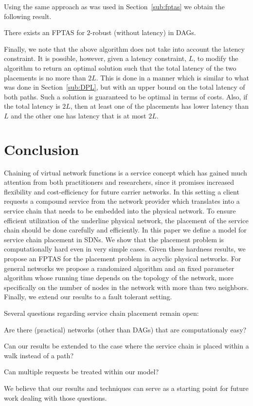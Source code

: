 Using the same approach as was used in Section~\ref{sub:fptas} we
obtain the following result.

\begin{theorem}
There exists an FPTAS for $2$-robust \scp (without latency) in DAGs.
\end{theorem}

Finally, we note that the above algorithm does not take into account
the latency constraint.  It is possible, however, given a latency
constraint, $L$, to modify the algorithm to return an optimal solution
such that the total latency of the two placements is no more than
$2L$.  This is done in a manner which is similar to what was done in
Section~\ref{sub:DPL}, but with an upper bound on the total latency of
both paths.  Such a solution is guaranteed to be optimal in terms of
costs.  Also, if the total latency is $2L$, then at least one of the
placements has lower latency than $L$ and the other one has latency
that is at most $2L$.



\section{Conclusion}

Chaining of virtual network functions is a service concept which has
gained much attention from both practitioners and researchers, since
it promises increased flexibility and cost-efficiency for future
carrier networks.
%
In this setting a client requests a compound service from the network
provider which translates into a service chain that needs to be
embedded into the physical network.  To ensure efficient utilization
of the underline physical network, the placement of the service chain
should be done carefully and efficiently.
%
In this paper we define a model for service chain placement in SDNs.
We show that the placement problem is computationally hard even in
very simple cases.  Given these hardness results, we propose an FPTAS
for the placement problem in acyclic physical networks.  For general
networks we propose a randomized algorithm and an fixed parameter
algorithm whose running time depends on the topology of the network,
more specifically on the number of nodes in the network with more than
two neighbors.  Finally, we extend our results to a fault tolerant
setting.

Several questions regarding service chain placement remain open:
\begin{inparaenum}[(i)]
\item Are there (practical) networks (other than DAGs) that are
  computationaly easy?
\item Can our results be extended to the case where the service chain
  is placed within a walk instead of a path?
\item Can multiple requests be treated within our model?
\end{inparaenum}
We believe that our results and techniques can serve as a starting
point for future work dealing with those questions.

